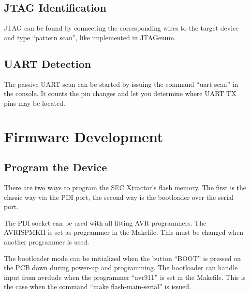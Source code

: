 \documentclass[a4paper]{report}
\begin{document}
\section{JTAG Identification}
JTAG can be found by connecting the corresponding wires to the target device and type ``pattern scan'', like implemented in JTAGenum.
\section{UART Detection}
The passive UART scan can be started by issuing the command ``uart scan'' in the console. It counts the pin changes and let you determine where UART TX pins may be located.
\chapter{Firmware Development}
\section{Program the Device}
There are two ways to program the SEC Xtractor's flash memory.
The first is the classic way via the PDI port, the second way is the bootloader over the serial port.

The PDI socket can be used with all fitting AVR programmers. The AVRISPMKII is set as programmer in the Makefile. This must be changed when another programmer is used.

The bootloader mode can be initialized when the button ``BOOT'' is pressed on the PCB down during power-up and programming.
The bootloader can handle input from avrdude when the programmer ``avr911'' is set in the Makefile. 
This is the case when the command ``make flash-main-serial'' is issued. 
\end{document}
